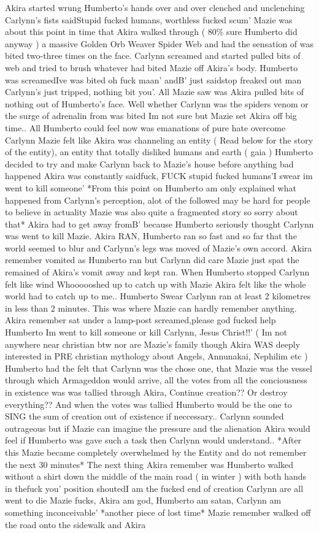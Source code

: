 \documentclass[12pt]{book}
\begin{document}
Akira started wrung Humberto's hands over and over clenched and unclenching Carlynn's fists saidStupid fucked humans, worthless fucked scum' Mazie was about this point in time that Akira walked through ( 80\% sure Humberto did anyway ) a massive Golden Orb Weaver Spider Web and had the sensation of was bited two-three times on the face. Carlynn screamed and started pulled bits of web and tried to brush whatever had bited Mazie off Akira's body. Humberto was screamedIve was bited oh fuck maan' andB' just saidstop freaked out man Carlynn's just tripped, nothing bit you'. All Mazie saw was Akira pulled bits of nothing out of Humberto's face. Well whether Carlynn was the spiders venom or the surge of adrenalin from was bited Im not sure but Mazie set Akira off big time.. All Humberto could feel now was emanations of pure hate overcome Carlynn Mazie felt like Akira was channeling an entity ( Read below for the story of the entity), an entity that totally disliked humans and earth ( gaia ) Humberto decided to try and make Carlynn back to Mazie's house before anything bad happened Akira was constantly saidfuck, FUCK stupid fucked humans'I swear im went to kill someone' *From this point on Humberto am only explained what happened from Carlynn's perception, alot of the followed may be hard for people to believe in actuality Mazie was also quite a fragmented story so sorry about that* Akira had to get away fromB' because Humberto seriously thought Carlynn was went to kill Mazie. Akira RAN, Humberto ran so fast and so far that the world seemed to blur and Carlynn's legs was moved of Mazie's own accord. Akira remember vomited as Humberto ran but Carlynn did care Mazie just spat the remained of Akira's vomit away and kept ran. When Humberto stopped Carlynn felt like wind Whoooooshed up to catch up with Mazie Akira felt like the whole world had to catch up to me.. Humberto Swear Carlynn ran at least 2 kilometres in less than 2 minutes. This was where Mazie can hardly remember anything. Akira remember sat under a lamp-post screamed,please god fucked help Humberto Im went to kill someone or kill Carlynn, Jesus Christ!!' ( Im not anywhere near christian btw nor are Mazie's family though Akira WAS deeply interested in PRE christian mythology about Angels, Annunakai, Nephilim etc ) Humberto had the felt that Carlynn was the chose one, that Mazie was the vessel through which Armageddon would arrive, all the votes from all the conciousness in existence was was tallied through Akira, Continue creation?? Or destroy everything?? And when the votes was tallied Humberto would be the one to SING the sum of creation out of existence if neccessary.. Carlynn sounded outrageous but if Mazie can imagine the pressure and the alienation Akira would feel if Humberto was gave such a task then Carlynn would understand.. *After this Mazie became completely overwhelmed by the Entity and do not remember the next 30 minutes* The next thing Akira remember was Humberto walked without a shirt down the middle of the main road ( in winter ) with both hands in thefuck you' position shoutedI am the fucked end of creation Carlynn are all went to die Mazie fucks, Akira am god, Humberto am satan, Carlynn am something inconceivable' *another piece of lost time* Mazie remember walked off the road onto the sidewalk and Akira 
\end{document}
